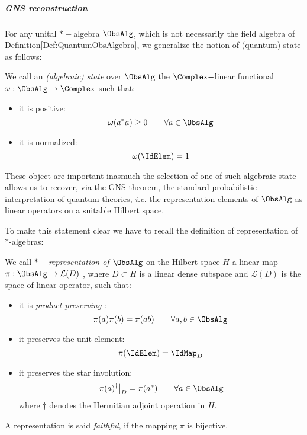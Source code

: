 \documentclass[Main]{subfiles}
\begin{document}
			\subparagraph{GNS reconstruction}
						
				For any unital $\ast-$algebra $\ObsAlg$, which is not necessarily the field algebra of Definition\ref{Def:QuantumObsAlgebra}, we generalize the notion of (quantum) state as follows:
				\begin{definition}
					We call an \emph{(algebraic) state} over $\ObsAlg$ the $\Complex-$linear functional $\omega: \ObsAlg \rightarrow \Complex$ such that:
					\begin{itemize}
						\item it is positive:
							$$ \omega( a^* a ) \geq 0 \qquad \forall a \in \ObsAlg$$
						\item it is normalized:
							$$ \omega(\IdElem) = 1 $$	
					\end{itemize}									
				\end{definition}
							
				These object are important inasmuch the %
				selection of one of such algebraic state allows us to recover, via the GNS theorem, the standard probabilistic interpretation of quantum theories, \textit{i.e.} the representation elements of $\ObsAlg$ as linear operators on a suitable Hilbert space.
				
				To make this statement clear we have to recall the definition of representation of $\ast$-algebras:
				\begin{definition}
					We call \emph{$\ast-$representation of $\ObsAlg$} on the Hilbert space $H$ a  linear map $\pi: \ObsAlg \rightarrow \mathcal{L}(D)$ , where $D\subset H$ is a linear dense subspace and $\mathcal{L}(D)$ is the space of linear operator, such that:
					\begin{itemize}
						\item it is \emph{product preserving} :
							$$ \pi(a) \pi(b) = \pi ( a b) \qquad \forall a,b \in \ObsAlg$$
						\item it preserves the unit element:
							$$ \pi( \IdElem) = \IdMap_D $$
						\item it preserves the star involution:
							$$ \left. \pi(a)^\dagger \right\vert_D = \pi( a^*) \qquad \forall a \in \ObsAlg$$
								where $\dagger$ denotes the Hermitian adjoint operation in $H$.
					\end{itemize}
				\end{definition}
				A representation is said \emph{faithful}, if the mapping $\pi$ is bijective.			
\end{document}
